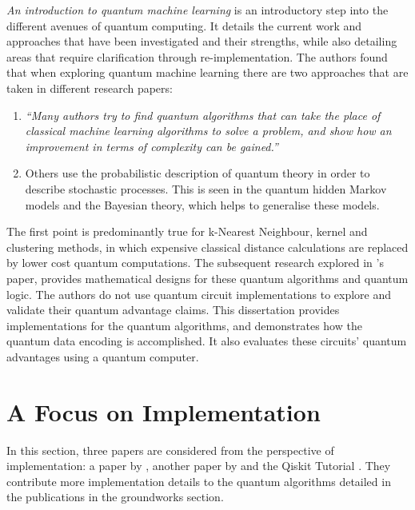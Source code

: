 \citep{research1} \emph{An introduction to quantum machine learning} is an introductory step into the different avenues of quantum computing. It details the current work and approaches that have been investigated and their strengths, while also detailing areas that require clarification through re-implementation. The authors found that when exploring quantum machine learning there are two approaches that are taken in different research papers:
 
\begin{enumerate}
\item \emph{``Many authors try to find quantum algorithms that can take the place of classical machine learning algorithms to solve a problem, and show how an improvement in terms of complexity can be gained.''} %


\item Others use the probabilistic description of quantum theory in order to describe stochastic processes. This is seen in the quantum hidden Markov models and the Bayesian theory, which helps to generalise these models.
\end{enumerate}

The first point is predominantly true for k-Nearest Neighbour, kernel and clustering methods, in which expensive classical distance calculations are replaced by lower cost quantum computations. The subsequent research explored in \citep{research1}'s paper, provides mathematical designs for these quantum algorithms and quantum logic. The authors do not use quantum circuit implementations to explore and validate their quantum advantage claims. This dissertation provides implementations for the quantum algorithms, and demonstrates how the quantum data encoding is accomplished. It also evaluates these circuits' quantum advantages using a quantum computer. 



\section{A Focus on Implementation}\label{StateImple}

In this section, three papers are considered from the perspective of implementation: a paper by \citeauthor{sharmaQeml}, another paper by \citeauthor{INGKOK} and the Qiskit Tutorial \citep{qiskit_videos_code}. They contribute more implementation details to the quantum algorithms detailed in the publications in the groundworks section. 

